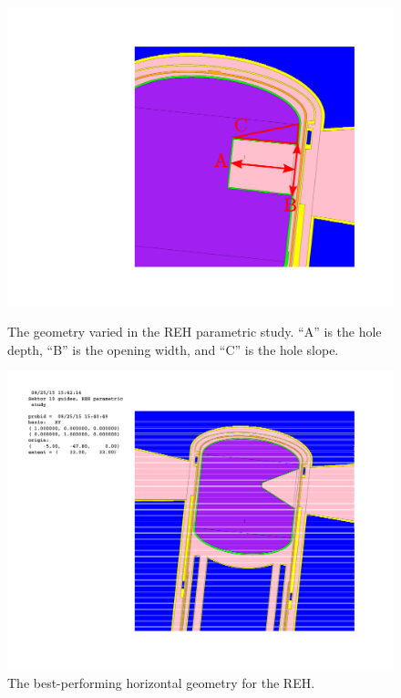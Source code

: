 \documentclass[a4paper]{jpconf}
\begin{document}
\begin{figure}[h]
\begin{minipage}{14pc}
\begin{center}
\includegraphics[scale=0.4,trim={13cm 6cm 4cm 5cm},clip]{graphics/para_geom.pdf}
\end{center}
\caption{\label{parametric_geom}The geometry varied in the REH parametric study. ``A'' is the hole depth, ``B'' is the opening width, and ``C'' is the hole slope.}
\end{minipage}\hfill%
\begin{minipage}{11pc}
\begin{center}
\includegraphics[scale=0.4,trim={11.2cm 8cm 5cm 3cm},clip]{graphics/case077.pdf}
\end{center}
\caption{\label{case077}The best-performing horizontal geometry for the REH.}
\end{minipage} 
\end{figure}
\end{document}
